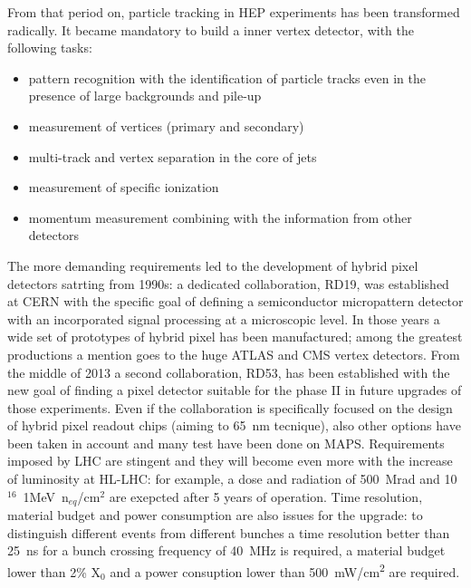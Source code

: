     From that period on, particle tracking in HEP experiments has been transformed radically. It became mandatory to build a inner vertex detector, with the following tasks:
    \begin{itemize}
        \item pattern recognition with the identification of particle tracks even in the presence of large backgrounds and pile-up
        \item measurement of vertices (primary and secondary)
        \item multi-track and vertex separation in the core of jets
        \item measurement of specific ionization
        \item momentum measurement combining with the information from other detectors 
    \end{itemize}

    The more demanding requirements led to the development of hybrid pixel detectors satrting from 1990s: a dedicated collaboration, RD19, was established at CERN with the specific goal of defining a semiconductor micropattern detector with an incorporated signal processing at a microscopic level. 
    In those years a wide set of prototypes of hybrid pixel has been manufactured; among the greatest productions a mention goes to the huge ATLAS and CMS vertex detectors. 
    From the middle of 2013 a second collaboration, RD53, has been established with the new goal of finding a pixel detector suitable for the phase II in future upgrades of those experiments. Even if the collaboration is specifically focused on the design of hybrid pixel readout chips (aiming to \SI{65}{nm} tecnique), also other options have been taken in account and many test have been done on MAPS. Requirements imposed by LHC are stingent and they will become even more with the increase of luminosity at HL-LHC: for example, a dose and radiation of \SI{500}{Mrad} and 10$^{16}$~1MeV~n$_{eq}$/cm$^2$ are exepcted after 5 years of operation. Time resolution, material budget and power consumption are also issues for the upgrade: to distinguish different events from different bunches a time resolution better than \SI{25}{ns} for a bunch crossing frequency of \SI{40}{MHz} is required, a material budget lower than 2\% X$_0$ and a power consuption lower than \SI{500}{mW/cm\squared} are required. 


